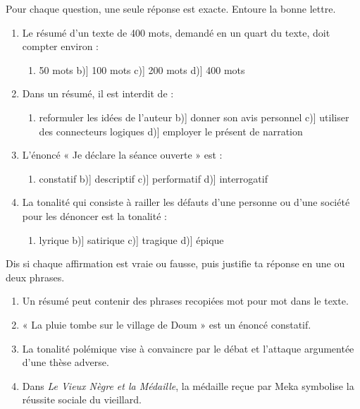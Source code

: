 \documentclass[11pt]{article}
\begin{document}
\begin{exercice}
Pour chaque question, une seule réponse est exacte. Entoure la bonne lettre.
\begin{enumerate}
\item Le résumé d'un texte de 400 mots, demandé en un quart du texte, doit compter environ :
\begin{enumerate}
\item[a)] 50 mots \quad b)] 100 mots \quad c)] 200 mots \quad d)] 400 mots
\end{enumerate}
\item Dans un résumé, il est interdit de :
\begin{enumerate}
\item[a)] reformuler les idées de l'auteur \quad b)] donner son avis personnel \quad c)] utiliser des connecteurs logiques \quad d)] employer le présent de narration
\end{enumerate}
\item L'énoncé « Je déclare la séance ouverte » est :
\begin{enumerate}
\item[a)] constatif \quad b)] descriptif \quad c)] performatif \quad d)] interrogatif
\end{enumerate}
\item La tonalité qui consiste à railler les défauts d'une personne ou d'une société pour les dénoncer est la tonalité :
\begin{enumerate}
\item[a)] lyrique \quad b)] satirique \quad c)] tragique \quad d)] épique
\end{enumerate}
\end{enumerate}
\end{exercice}

\begin{exercice}
Dis si chaque affirmation est vraie ou fausse, puis justifie ta réponse en une ou deux phrases.
\begin{enumerate}
\item Un résumé peut contenir des phrases recopiées mot pour mot dans le texte.
\item « La pluie tombe sur le village de Doum » est un énoncé constatif.
\item La tonalité polémique vise à convaincre par le débat et l'attaque argumentée d'une thèse adverse.
\item Dans \emph{Le Vieux Nègre et la Médaille}, la médaille reçue par Meka symbolise la réussite sociale du vieillard.
\end{enumerate}
\end{exercice}
\end{document}
